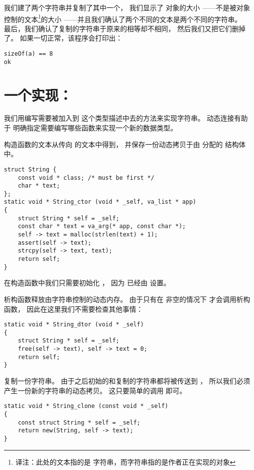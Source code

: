 我们建了两个字符串并复制了其中一个，
我们显示了  对象的大小
——不是被对象控制的文本\footnote{
    译注：此处的文本指的是  字符串，而字符串指的是作者正在实现的对象
}的大小
——并且我们确认了两个不同的文本是两个不同的字符串。
最后，我们确认了复制的字符串于原来的相等却不相同，
然后我们又把它们删掉了。
如果一切正常，该程序会打印出：

\begin{lstlisting}
sizeOf(a) == 8
ok
\end{lstlisting}

\section{一个实现：}
\label{sec:string}

我们用编写需要被加入到  这个类型描述中去的方法来实现字符串。
动态连接有助于 明确指定需要编写哪些函数来实现一个新的数据类型。

构造函数的文本从传向  的文本中得到，
并保存一份动态拷贝于由  分配的  结构体中。

\begin{lstlisting}
struct String {
    const void * class; /* must be first */
    char * text;
};
static void * String_ctor (void * _self, va_list * app)
{   
    struct String * self = _self;
    const char * text = va_arg(* app, const char *);
    self -> text = malloc(strlen(text) + 1);
    assert(self -> text);
    strcpy(self -> text, text);
    return self;
}
\end{lstlisting}

在构造函数中我们只需要初始化 ，
因为  已经由  设置。

析构函数释放由字符串控制的动态内存。
由于只有在  非空的情况下  才会调用析构函数，
因此在这里我们不需要检查其他事情：
\begin{lstlisting}
static void * String_dtor (void * _self)
{   
    struct String * self = _self;
    free(self -> text), self -> text = 0;
    return self;
}
\end{lstlisting}

 复制一份字符串。
由于之后初始的和复制的字符串都将被传送到 ，
所以我们必须产生一份新的字符串的动态拷贝。
这只要简单的调用  即可。
\begin{lstlisting}
static void * String_clone (const void * _self)
{   
    const struct String * self = _self;
    return new(String, self -> text);
}
\end{lstlisting}

